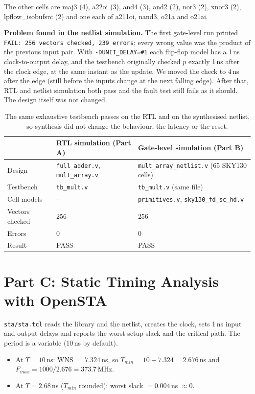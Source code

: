 \documentclass[11pt,a4paper]{article}
\begin{document}
The other cells are maj3 (4), a22oi (3), and4 (3), and2 (2), nor3 (2), xnor3 (2),
lpflow\_isobufsrc (2) and one each of a211oi, nand3, o21a and o21ai.

\textbf{Problem found in the netlist simulation.} The first gate-level run printed
\texttt{FAIL: 256 vectors checked, 239 errors}; every wrong value was the product of the previous
input pair. With \texttt{-DUNIT\_DELAY=\#1} each flip-flop model has a 1\,ns clock-to-output delay,
and the testbench originally checked $p$ exactly 1\,ns after the clock edge, at the same instant as
the update. We moved the check to 4\,ns after the edge (still before the inputs change at the
next falling edge). After that, RTL and netlist simulation both pass and the fault test still
fails as it should. The design itself was not changed.

\begin{table}[H]
\centering
\small
\begin{tabular}{@{}lll@{}}
\toprule
 & RTL simulation (Part A) & Gate-level simulation (Part B) \\
\midrule
Design & \texttt{full\_adder.v}, \texttt{mult\_array.v} & \texttt{mult\_array\_netlist.v} (65 SKY130 cells) \\
Testbench & \texttt{tb\_mult.v} & \texttt{tb\_mult.v} (same file) \\
Cell models & -- & \texttt{primitives.v}, \texttt{sky130\_fd\_sc\_hd.v} \\
Vectors checked & 256 & 256 \\
Errors & 0 & 0 \\
Result & PASS & PASS \\
\bottomrule
\end{tabular}
\caption{The same exhaustive testbench passes on the RTL and on the synthesised netlist, so
synthesis did not change the behaviour, the latency or the reset.}
\end{table}

\section{Part C: Static Timing Analysis with OpenSTA}

\texttt{sta/sta.tcl} reads the library and the netlist, creates the clock, sets 1\,ns input and
output delays and reports the worst setup slack and the critical path. The period is a variable
(10\,ns by default).

\begin{itemize}
  \item At $T = 10$\,ns: WNS $= 7.324$\,ns, so $T_{min} = 10 - 7.324 = 2.676$\,ns and
        $F_{max} = 1000 / 2.676 = 373.7$\,MHz.
  \item At $T = 2.68$\,ns ($T_{min}$ rounded): worst slack $= 0.004$\,ns $\approx 0$.
\end{itemize}
\end{document}
